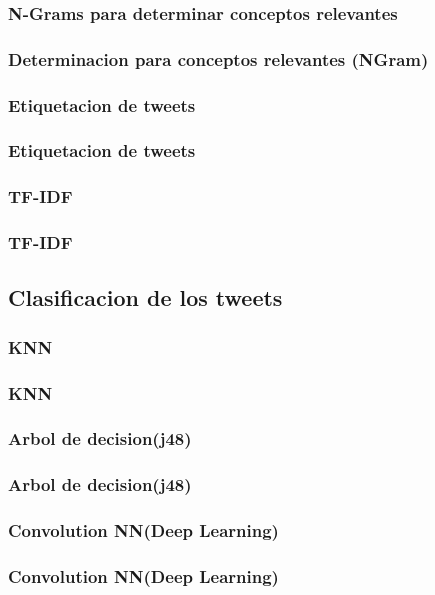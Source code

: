 \documentclass{beamer}
\begin{document}
\subsubsection{N-Grams para determinar conceptos relevantes}
\begin{frame}
\frametitle{Determinacion para conceptos relevantes (NGram)}
\end{frame}


\subsubsection{Etiquetacion de tweets}
\begin{frame}
\frametitle{Etiquetacion de tweets}
\end{frame}


\subsubsection{TF-IDF}
\begin{frame}
\frametitle{TF-IDF}
\end{frame}




\subsection{Clasificacion de los tweets}
\subsubsection{KNN}
\begin{frame}
\frametitle{KNN}
\end{frame}
\subsubsection{Arbol de decision(j48)}
\begin{frame}
\frametitle{Arbol de decision(j48)}
\end{frame}
\subsubsection{Convolution NN(Deep Learning)}
\begin{frame}
\frametitle{Convolution NN(Deep Learning)}
\end{frame}
\end{document}
